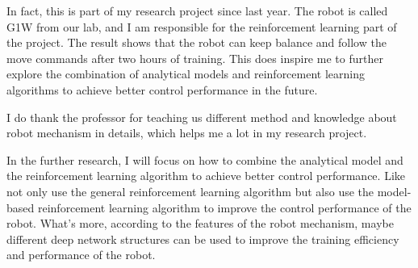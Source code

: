 \documentclass{article}
\begin{document}
In fact, this is part of my research project since last year. The robot is called G1W from our lab, and I am responsible for the reinforcement learning part of the project.
The result shows that the robot can keep balance and follow the move commands after two hours of training. 
This does inspire me to further explore the combination of analytical models and reinforcement learning algorithms to achieve better control performance in the future.

I do thank the professor for teaching us different method and knowledge about robot mechanism in details, which helps me a lot in my research project.

In the further research, I will focus on how to combine the analytical model and the reinforcement learning algorithm to achieve better control performance. 
Like not only use the general reinforcement learning algorithm but also use the model-based reinforcement learning algorithm to improve the control performance of the robot.
What's more, according to the features of the robot mechanism, maybe different deep network structures can be used to improve the training efficiency and performance of the robot.



\end{document}
